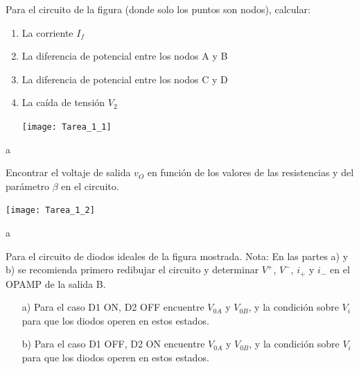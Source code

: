 \documentclass[
  11pt,
  letterpaper,
   addpoints,
  ]{exam}
\begin{document}
\begin{questions}
    \question     
    Para el circuito de la figura (donde solo los puntos son nodos), calcular:
    \begin{enumerate}
        \item La corriente $I_f$
        \item La diferencia de potencial entre los nodos A y B
        \item La diferencia de potencial entre los nodos C y D
        \item La caída de tensión $V_2$
        \begin{center}
            \texttt{[image: Tarea\_1\_1]}
        \end{center}
    \end{enumerate}
    \begin{solution}
        a
    \end{solution}
    \question  Encontrar el voltaje de salida $v_O$ en función de los valores de las resistencias y del parámetro $\beta$ en el circuito.
    \begin{center}
        \texttt{[image: Tarea\_1\_2]}
    \end{center}
    \begin{solution}
       a
    \end{solution}
\question  Para el circuito de diodos ideales de la figura mostrada. Nota: En las partes a) y b) se recomienda primero redibujar el circuito y determinar $V^+$, $V^-$, $i_+$ y $i_-$ en el OPAMP de la salida B.

\begin{enumerate}
    \item[a)] Para el caso D1 ON, D2 OFF encuentre $V_{0A}$ y $V_{0B}$, y la condición sobre $V_i$ para que los diodos operen en estos estados.

    \item[b)] Para el caso D1 OFF, D2 ON encuentre $V_{0A}$ y $V_{0B}$, y la condición sobre $V_i$ para que los diodos operen en estos estados.


\end{enumerate}
\end{questions}
\end{document}
